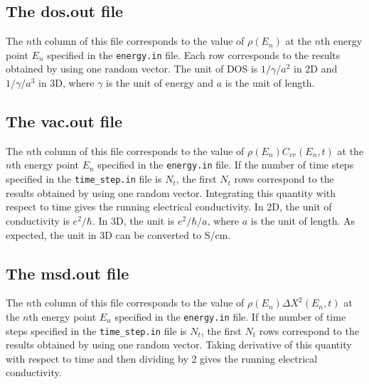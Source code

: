 \documentclass[12pt,a4paper]{report}
\begin{document}
\subsection{The dos.out file}

The $n$th column of this file corresponds to the value of $\rho(E_n)$ at the $n$th energy point $E_n$ specified in the \verb"energy.in" file. Each row corresponds to the results obtained by using one random vector. The unit of DOS is $1/\gamma/a^2$ in 2D and $1/\gamma/a^3$ in 3D, where $\gamma$ is the unit of energy and $a$ is the unit of length.


\subsection{The vac.out file}

The $n$th column of this file corresponds to the value of $\rho(E_n)C_{vv}(E_n,t)$ at the $n$th energy point $E_n$ specified in the \verb"energy.in" file. If the number of time steps specified in the \verb"time_step.in" file is $N_t$, the first $N_t$ rows correspond to the results obtained by using one random vector. Integrating this quantity with respect to time gives the running electrical conductivity. In 2D, the unit of conductivity is $e^2/\hbar$. In 3D, the unit is $e^2/\hbar/a$, where $a$ is the unit of length. As expected, the unit in 3D can be converted to S/cm.

\subsection{The msd.out file}

The $n$th column of this file corresponds to the value of $\rho(E_n) \Delta X^2(E_n,t)$ at the $n$th energy point $E_n$ specified in the \verb"energy.in" file. If the number of time steps specified in the \verb"time_step.in" file is $N_t$, the first $N_t$ rows correspond to the results obtained by using one random vector. Taking derivative of this quantity with respect to time and then dividing by 2 gives the running electrical conductivity. 









\end{document}
